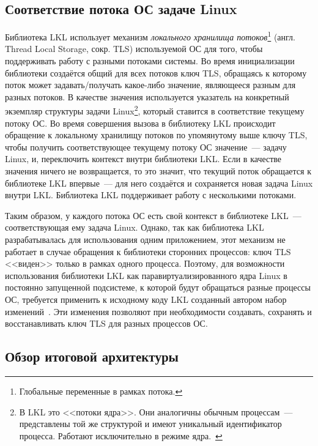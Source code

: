 
\subsection{Соответствие потока ОС задаче Linux}
Библиотека LKL использует механизм \textit{локального хранилища потоков}\footnote{Глобальные переменные в рамках потока.} (англ. Thread Local Storage, сокр. TLS) используемой ОС для того, чтобы поддерживать работу с разными потоками системы. Во время инициализации библиотеки создаётся общий для всех потоков ключ TLS, обращаясь к которому поток может задавать/получать какое-либо значение, являющееся разным для разных потоков. В качестве значения используется указатель на конкретный экземпляр структуры задачи Linux\footnote{В LKL это <<потоки ядра>>. Они аналогичны обычным процессам~--- представлены той же структурой и имеют уникальный идентификатор процесса. Работают исключительно в режиме ядра.~\cite[с.~30]{mastering-linux-kernel-dev}}, который ставится в соответствие текущему потоку ОС. Во время совершения вызова в библиотеку LKL происходит обращение к локальному хранилищу потоков по упомянутому выше ключу TLS, чтобы получить соответствующее текущему потоку ОС значение~--- задачу Linux, и, переключить контекст внутри библиотеки LKL. Если в качестве значения ничего не возвращается, то это значит, что текущий поток обращается к библиотеке LKL впервые~--- для него создаётся и сохраняется новая задача Linux внутри LKL. Библиотека LKL поддерживает работу с несколькими потоками.

Таким образом, у каждого потока ОС есть свой контекст в библиотеке LKL~--- соответствующая ему задача Linux. Однако, так как библиотека LKL разрабатывалась для использования одним приложением, этот механизм не работает в случае обращения к библиотеки сторонних процессов: ключ TLS <<виден>> только в рамках одного процесса. Поэтому, для возможности использования библиотеки LKL как паравиртуализированного ядра Linux в постоянно запущенной подсистеме, к которой будут обращаться разные процессы ОС, требуется применить к исходному коду LKL созданный автором набор изменений~\cite{lkl-tls-enhancement}. Эти изменения позволяют при необходимости создавать, сохранять и восстанавливать ключ TLS для разных процессов ОС.


\subsection{Обзор итоговой архитектуры}


